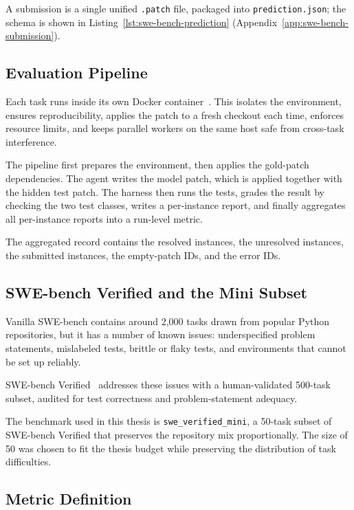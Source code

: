 A submission is a single unified \texttt{.patch} file, packaged into
\texttt{prediction.json}; the schema is shown in
Listing~\ref{lst:swe-bench-prediction}
(Appendix~\ref{app:swe-bench-submission}).

\subsection{Evaluation Pipeline}

Each task runs inside its own Docker container~\cite{Merkel:14}.
This isolates the environment, ensures reproducibility, applies the
patch to a fresh checkout each time, enforces resource limits, and
keeps parallel workers on the same host safe from cross-task
interference.

The pipeline first prepares the environment, then applies the
gold-patch dependencies. The agent writes the model patch, which is
applied together with the hidden test patch. The harness then runs the
tests, grades the result by checking the two test classes, writes a
per-instance report, and finally aggregates all per-instance reports
into a run-level metric.

The aggregated record contains the resolved instances, the unresolved
instances, the submitted instances, the empty-patch IDs, and the
error IDs.

\subsection{SWE-bench Verified and the Mini Subset}

Vanilla SWE-bench contains around 2{,}000 tasks drawn from popular
Python repositories, but it has a number of known issues:
underspecified problem statements, mislabeled tests, brittle or flaky
tests, and environments that cannot be set up reliably.

SWE-bench Verified~\cite{Jimenez:24verified} addresses these issues
with a human-validated 500-task subset, audited for test correctness
and problem-statement adequacy.

The benchmark used in this thesis is \texttt{swe\_verified\_mini}, a
50-task subset of SWE-bench Verified that preserves the repository mix
proportionally. The size of 50 was chosen to fit the thesis budget
while preserving the distribution of task difficulties.

\subsection{Metric Definition}

